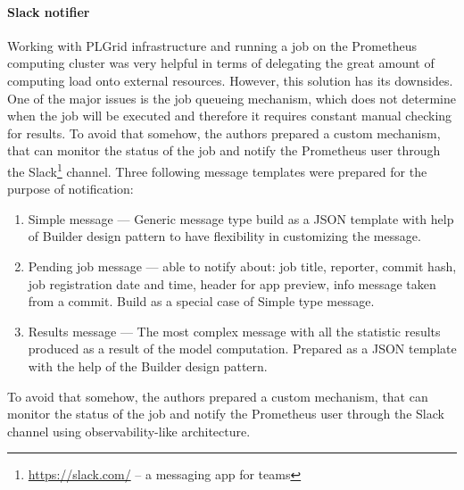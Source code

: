 \paragraph{Slack notifier}\label{para:slack-notifier}
Working with PLGrid infrastructure and running a job on the Prometheus computing cluster was very helpful in terms of delegating the great amount of computing load onto external resources.
However, this solution has its downsides.
One of the major issues is the job queueing mechanism, which does not determine when the job will be executed and therefore it requires constant manual checking for results.
To avoid that somehow, the authors prepared a custom mechanism, that can monitor the status of the job and notify the Prometheus user through the Slack\footnote{\url{https://slack.com/} – a messaging app for teams} channel.
Three following message templates were prepared for the purpose of notification:
\begin{enumerate}
    \item Simple message --- Generic message type build as a JSON template with help of Builder design pattern to have flexibility in customizing the message.
    \item Pending job message --- able to notify about: job title, reporter, commit hash, job registration date and time, header for app preview, info message taken from a commit.
    Build as a special case of Simple type message.
    \item Results message --- The most complex message with all the statistic results produced as a result of the model computation.
    Prepared as a JSON template with the help of the Builder design pattern.
\end{enumerate}

To avoid that somehow, the authors prepared a custom mechanism, that can monitor the status of the job and notify the Prometheus user through the Slack channel using observability-like architecture.
